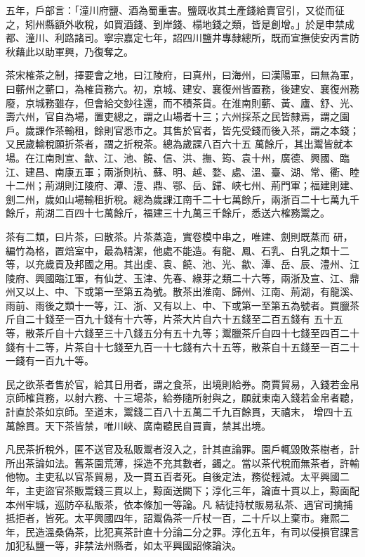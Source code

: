 \begin{pinyinscope}
 五年，戶部言：「潼川府鹽、酒為蜀重害。鹽既收其土產錢給賣官引，又從而征之，矧州縣額外收稅，如買酒錢、到岸錢、榻地錢之類，皆是創增。」於是申禁成都、潼川、利路諸司。寧宗嘉定七年，詔四川鹽井專隸總所，既而宣撫使安丙言防秋藉此以助軍興，乃復奪之。



 茶宋榷茶之制，擇要會之地，曰江陵府，曰真州，曰海州，曰漢陽軍，曰無為軍，曰蘄州之蘄口，為榷貨務六。初，京城、建安、襄復州皆置務，後建安、襄復州務廢，京城務雖存，但會給交鈔往還，而不積茶貨。在淮南則蘄、黃、廬、舒、光、壽六州，官自為場，置吏總之，謂之山場者十三；六州採茶之民皆隸焉，謂之園戶。歲課作茶輸租，餘則官悉市之。其售於官者，皆先受錢而後入茶，謂之本錢；又民歲輸稅願折茶者，謂之折稅茶。總為歲課八百六十五
 萬餘斤，其出鬻皆就本場。在江南則宣、歙、江、池、饒、信、洪、撫、筠、袁十州，廣德、興國、臨江、建昌、南康五軍；兩浙則杭、蘇、明、越、婺、處、溫、臺、湖、常、衢、睦十二州；荊湖則江陵府、潭、澧、鼎、鄂、岳、歸、峽七州、荊門軍；福建則建、劍二州，歲如山場輸租折稅。總為歲課江南千二十七萬餘斤，兩浙百二十七萬九千餘斤，荊湖二百四十七萬餘斤，福建三十九萬三千餘斤，悉送六榷務鬻之。



 茶有二類，曰片茶，曰散茶。片茶蒸造，實卷模中串之，唯建、劍則既蒸而
 研，編竹為格，置焙室中，最為精潔，他處不能造。有龍、鳳、石乳、白乳之類十二等，以充歲貢及邦國之用。其出虔、袁、饒、池、光、歙、潭、岳、辰、澧州、江陵府、興國臨江軍，有仙芝、玉津、先春、綠芽之類二十六等，兩浙及宣、江、鼎州又以上、中、下或第一至第五為號。散茶出淮南、歸州、江南、荊湖，有龍溪、雨前、雨後之類十一等，江、浙、又有以上、中、下或第一至第五為號者。買臘茶斤自二十錢至一百九十錢有十六等，片茶大片自六十五錢至二百五錢有
 五十五等，散茶斤自十六錢至三十八錢五分有五十九等；鬻臘茶斤自四十七錢至四百二十錢有十二等，片茶自十七錢至九百一十七錢有六十五等，散茶自十五錢至一百二十一錢有一百九十等。



 民之欲茶者售於官，給其日用者，謂之食茶，出境則給券。商賈貿易，入錢若金帛京師榷貨務，以射六務、十三場茶，給券隨所射與之，願就東南入錢若金帛者聽，計直於茶如京師。至道末，鬻錢二百八十五萬二千九百餘貫，天禧末，
 增四十五萬餘貫。天下茶皆禁，唯川峽、廣南聽民自買賣，禁其出境。



 凡民茶折稅外，匿不送官及私販鬻者沒入之，計其直論罪。園戶輒毀敗茶樹者，計所出茶論如法。舊茶園荒薄，採造不充其數者，蠲之。當以茶代稅而無茶者，許輸他物。主吏私以官茶貿易，及一貫五百者死。自後定法，務從輕減。太平興國二年，主吏盜官茶販鬻錢三貫以上，黥面送闕下；淳化三年，論直十貫以上，黥面配本州牢城，巡防卒私販茶，依本條加一等論。凡
 結徒持杖販易私茶、遇官司擒捕抵拒者，皆死。太平興國四年，詔鬻偽茶一斤杖一百，二十斤以上棄市。雍熙二年，民造溫桑偽茶，比犯真茶計直十分論二分之罪。淳化五年，有司以侵損官課言加犯私鹽一等，非禁法州縣者，如太平興國詔條論決。




\end{pinyinscope}
